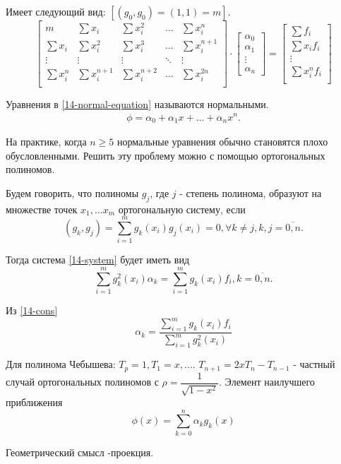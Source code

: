 Имеет следующий вид: $[(g_0, g_0) = (1, 1) = m]$.
\begin{equation}
  \label{14-normal-equation}
  \begin{bmatrix}
    m & \sum\limits x_i & \sum\limits x_i^2 & \ldots & \sum x_i^n\\
    \sum x_i & \sum x_i^2 & \sum x_i^3 & \ldots & \sum x_i^{n + 1}\\
    \vdots & \vdots & \vdots & \ddots & \vdots\\
    \sum x_i^n & \sum x_i^{n + 1} & \sum x_i^{n + 2} & \ldots & \sum x_i^{2n}\\
  \end{bmatrix}\cdot
  \begin{bmatrix}
    \alpha_0\\
    \alpha_1\\
    \vdots\\
    \alpha_n
  \end{bmatrix}
  = \begin{bmatrix}
    \sum f_i\\
    \sum x_i f_i\\
    \vdots\\
    \sum x_i^nf_i\\
  \end{bmatrix}
\end{equation}

Уравнения в \eqref{14-normal-equation} называются нормальными.
\begin{align*}
  \phi = \alpha_0 + \alpha_1x + \ldots + \alpha_nx^n.
\end{align*}

На практике, когда $n \geqslant 5$ нормальные уравнения обычно становятся плохо
обусловленными. Решить эту проблему можно с помощью ортогональных полиномов.

Будем говорить, что полиномы $g_j$, где $j$ - степень полинома, образуют на
множестве точек $x_1, \ldots x_m$ ортогональную систему, если
\begin{equation}
  (g_k, g_j) = \sum\limits_{i = 1}^m g_k(x_i)g_j(x_i) = 0, \forall k \neq j,
  k, j = \overline{0, n}.
\end{equation}

Тогда система \eqref{14-system} будет иметь вид
\begin{equation}
  \label{14-cons}
  \sum\limits_{i = 1}^mg_k^2(x_i)\alpha_k = \sum\limits_{i = 1}^mg_k(x_i)f_i,
  k = \overline{0, n}.
\end{equation}

Из \eqref{14-cons}
\begin{equation}
  \alpha_k = \dfrac{\sum\limits_{i = 1}^m g_k(x_i)f_i}
                   {\sum\limits_{i = 1}^m g_k^2(x_i)}
\end{equation}

Для полинома Чебышева: $T_p = 1, T_1 = x, \ldots$.
$T_{n + 1} = 2xT_n - T_{n - 1}$ - частный случай ортогональных полиномов с
$\rho = \dfrac{1}{\sqrt{1 - x^2}}$. Элемент наилучшего приближения
\begin{equation}
  \phi(x) = \sum\limits_{k = 0}^n\alpha_kg_k(x)
\end{equation}

Геометрический смысл -проекция.
